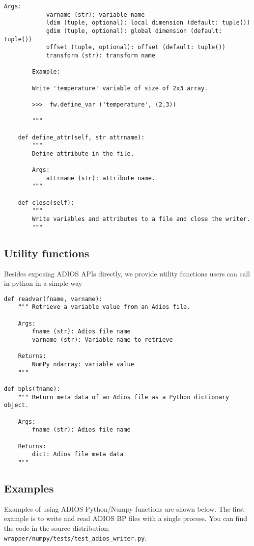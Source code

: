 \begin{lstlisting}[language=cython,caption={Writer functions},label={},]
        Args:
            varname (str): variable name
            ldim (tuple, optional): local dimension (default: tuple())
            gdim (tuple, optional): global dimension (default: tuple())
            offset (tuple, optional): offset (default: tuple())
            transform (str): transform name

        Example:

        Write 'temperature' variable of size of 2x3 array.

        >>>  fw.define_var ('temperature', (2,3))

        """

    def define_attr(self, str attrname):
        """
        Define attribute in the file.

        Args:
            attrname (str): attribute name.
        """

    def close(self):
        """
        Write variables and attributes to a file and close the writer.
        """

\end{lstlisting}

\subsection{Utility functions}
Besides exposing ADIOS APIs directly, we provide utility functions users can call in python in a simple way

\begin{lstlisting}[language=cython,caption={Utility functions},label={},]
def readvar(fname, varname):
    """ Retrieve a variable value from an Adios file.

    Args:
        fname (str): Adios file name
        varname (str): Variable name to retrieve

    Returns:
        NumPy ndarray: variable value
    """

def bpls(fname):
    """ Return meta data of an Adios file as a Python dictionary object.

    Args:
        fname (str): Adios file name

    Returns:
        dict: Adios file meta data
    """
\end{lstlisting}

\subsection{Examples}
Examples of using ADIOS Python/Numpy functions are shown below. The first example is to write and read ADIOS BP files with a single process. You can find the code in the source distribution: \\
\verb+wrapper/numpy/tests/test_adios_writer.py+.


